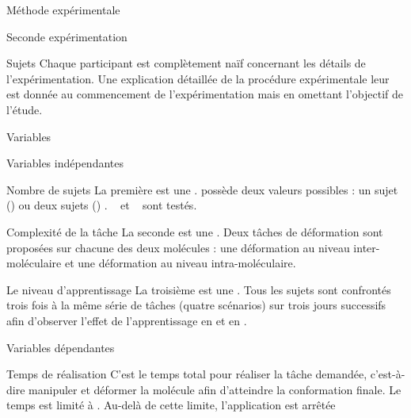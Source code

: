 \documentclass[myfrancais,ngerman,english,frenchb]{mythesis}
\begin{document}
\begin{mychapter}{Méthode expérimentale}
\begin{mysection}{Seconde expérimentation}
\begin{mysubsection}{Sujets}
				Chaque participant est complètement naïf concernant les détails de l'expérimentation.
				Une explication détaillée de la procédure expérimentale leur est donnée au commencement de l'expérimentation mais en omettant l'objectif de l'étude.
			\end{mysubsection}
			\begin{mysubsection}{Variables}
				\begin{mysubsubsection}{Variables indépendantes}
					\begin{myparagraph}{ Nombre de sujets}
						La première  est une .
						 possède deux valeurs possibles : \og un sujet (\mycf {}) \fg ou \og deux sujets (\mycf {}) \fg.
						\mynum{12}~ et ~ sont testés.
					\end{myparagraph}
					\begin{myparagraph}{ Complexité de la tâche}
						La seconde  est une .
						Deux tâches de déformation sont proposées sur chacune des deux molécules : une déformation au niveau inter-moléculaire et une déformation au niveau intra-moléculaire.
					\end{myparagraph}
					\begin{myparagraph}{ Le niveau d'apprentissage}
						La troisième  est une .
						Tous les sujets sont confrontés trois fois à la même série de tâches (quatre scénarios) sur trois jours successifs afin d'observer l'effet de l'apprentissage en  et en .
					\end{myparagraph}
				\end{mysubsubsection}
				\begin{mysubsubsection}{Variables dépendantes}
					\begin{myparagraph}{ Temps de réalisation}
						C'est le temps total pour réaliser la tâche demandée, c'est-à-dire manipuler et déformer la molécule afin d'atteindre la conformation finale.
						Le temps est limité à .
						Au-delà de cette limite, l'application est arrêtée

\end{myparagraph}
\end{mysubsubsection}
\end{mysubsection}
\end{mysection}
\end{mychapter}
\end{document}
